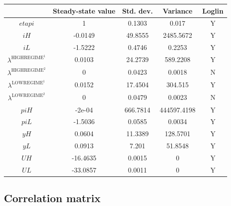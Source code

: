 \begin{tabular}{c|c|c|c|c|}
  & Steady-state value & Std. dev. & Variance & Loglin\\
\hline
${e\!t\!a\!p\!i}$ & 1 & 0.1303 & 0.017 & Y    \\
${i\!H}$ & -0.0149 & 49.8555 & 2485.5672 & Y    \\
${i\!L}$ & -1.5222 & 0.4746 & 0.2253 & Y    \\
$\lambda^{\mathrm{HIGHREGIME}^{\mathrm{1}}}$ & 0.0103 & 24.2739 & 589.2208 & Y    \\
$\lambda^{\mathrm{HIGHREGIME}^{\mathrm{2}}}$ & 0 & 0.0423 & 0.0018 & N    \\
$\lambda^{\mathrm{LOWREGIME}^{\mathrm{1}}}$ & 0.0152 & 17.4504 & 304.515 & Y    \\
$\lambda^{\mathrm{LOWREGIME}^{\mathrm{2}}}$ & 0 & 0.0479 & 0.0023 & N    \\
${p\!i\!H}$ & -2e-04 & 666.7814 & 444597.4198 & Y    \\
${p\!i\!L}$ & -1.5036 & 0.0585 & 0.0034 & Y    \\
${y\!H}$ & 0.0604 & 11.3389 & 128.5701 & Y    \\
${y\!L}$ & 0.0913 & 7.201 & 51.8548 & Y    \\
${U\!H}$ & -16.4635 & 0.0015 & 0 & Y    \\
${U\!L}$ & -33.0857 & 0.0011 & 0 & Y    \\
\hline
\end{tabular}


\subsection{Correlation matrix}

